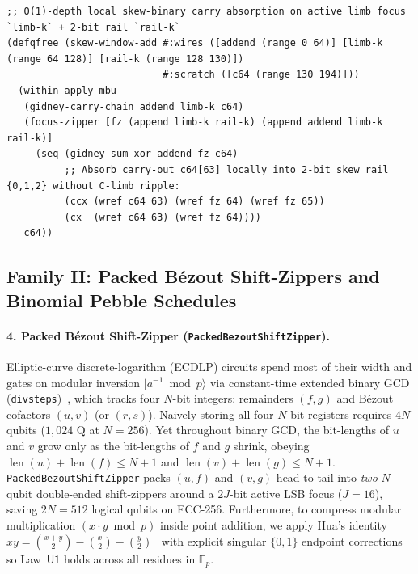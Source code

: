 \documentclass[acmsmall,screen,anonymous]{acmart}
\DeclareRobustCommand{\_}{\ifmmode\text{\char95}\else\char95\penalty0\relax\fi}
\theoremstyle{plain}
\begin{document}
\begin{lstlisting}[language=LakefillLisp,caption={Composing \texttt{within-apply-mbu}, \texttt{focus-zipper}, and skew-binary local carry folding in \texttt{\#lang lakefillq}.},label={alg:qds_fam1}]
;; O(1)-depth local skew-binary carry absorption on active limb focus `limb-k` + 2-bit rail `rail-k`
(defqfree (skew-window-add #:wires ([addend (range 0 64)] [limb-k (range 64 128)] [rail-k (range 128 130)])
                           #:scratch ([c64 (range 130 194)]))
  (within-apply-mbu
   (gidney-carry-chain addend limb-k c64)
   (focus-zipper [fz (append limb-k rail-k) (append addend limb-k rail-k)]
     (seq (gidney-sum-xor addend fz c64)
          ;; Absorb carry-out c64[63] locally into 2-bit skew rail {0,1,2} without C-limb ripple:
          (ccx (wref c64 63) (wref fz 64) (wref fz 65))
          (cx  (wref c64 63) (wref fz 64))))
   c64))
\end{lstlisting}

\subsection{Family II: Packed B\'{e}zout Shift-Zippers and Binomial Pebble Schedules}
\label{sec:qds_fam2}

\paragraph{4. Packed B\'{e}zout Shift-Zipper (\texttt{PackedBezoutShiftZipper}).}
Elliptic-curve discrete-logarithm (ECDLP) circuits spend most of their width and gates on modular inversion $|a^{-1} \bmod p\rangle$ via constant-time extended binary GCD (\texttt{divsteps})~\cite{roetteler2017,haner2020,bernsteinyang2019}, which tracks four $N$-bit integers: remainders $(f, g)$ and B\'{e}zout cofactors $(u, v)$ (or $(r, s)$). Naively storing all four $N$-bit registers requires $4N$ qubits ($1{,}024\text{ Q}$ at $N = 256$). Yet throughout binary GCD, the bit-lengths of $u$ and $v$ grow only as the bit-lengths of $f$ and $g$ shrink, obeying $\operatorname{len}(u) + \operatorname{len}(f) \le N + 1$ and $\operatorname{len}(v) + \operatorname{len}(g) \le N + 1$. \texttt{PackedBezoutShiftZipper} packs $(u, f)$ and $(v, g)$ head-to-tail into \emph{two} $N$-qubit double-ended shift-zippers around a $2J$-bit active LSB focus ($J = 16$), saving $2N = 512$ logical qubits on ECC-256. Furthermore, to compress modular multiplication $(x \cdot y \bmod p)$ inside point addition, we apply Hua's identity $x y = \binom{x+y}{2} - \binom{x}{2} - \binom{y}{2}$~\cite{hua1949} with explicit singular $\{0, 1\}$ endpoint corrections so Law~$\mathsf{U1}$ holds across all residues in $\mathbb{F}_p$.
\end{document}
